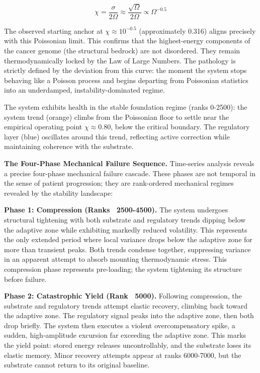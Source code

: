 \documentclass[11pt,letterpaper]{article}
\begin{document}
\begin{equation}
\chi = \frac{\sigma}{2\Omega} \approx \frac{\sqrt{\Omega}}{2\Omega} \propto \Omega^{-0.5}
\label{eq:poisson_limit}
\end{equation}

The observed starting anchor at $\chi \approx 10^{-0.5}$ (approximately 0.316) aligns precisely with this Poissonian limit. This confirms that the highest-energy components of the cancer genome (the structural bedrock) are not disordered. They remain thermodynamically locked by the Law of Large Numbers. The pathology is strictly defined by the deviation from this curve: the moment the system stops behaving like a Poisson process and begins departing from Poissonian statistics into an underdamped, instability-dominated regime.

The system exhibits health in the stable foundation regime (ranks 0-2500): the system trend (orange) climbs from the Poissonian floor to settle near the empirical operating point $\chi \approx 0.80$, below the critical boundary. The regulatory layer (blue) oscillates around this trend, reflecting active correction while maintaining coherence with the substrate.

\textbf{The Four-Phase Mechanical Failure Sequence.} Time-series analysis reveals a precise four-phase mechanical failure cascade. These phases are not temporal in the sense of patient progression; they are rank-ordered mechanical regimes revealed by the stability landscape:

\textbf{Phase 1: Compression (Ranks ~2500-4500).} The system undergoes structural tightening with both substrate and regulatory trends dipping below the adaptive zone while exhibiting markedly reduced volatility. This represents the only extended period where local variance drops below the adaptive zone for more than transient peaks. Both trends condense together, suppressing variance in an apparent attempt to absorb mounting thermodynamic stress. This compression phase represents pre-loading; the system tightening its structure before failure.

\textbf{Phase 2: Catastrophic Yield (Rank ~5000).} Following compression, the substrate and regulatory trends attempt elastic recovery, climbing back toward the adaptive zone. The regulatory signal peaks into the adaptive zone, then both drop briefly. The system then executes a violent overcompensatory spike, a sudden, high-amplitude excursion far exceeding the adaptive zone. This marks the yield point: stored energy releases uncontrollably, and the substrate loses its elastic memory. Minor recovery attempts appear at ranks 6000-7000, but the substrate cannot return to its original baseline.
\end{document}
